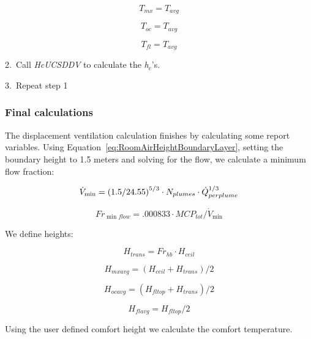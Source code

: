 {\begin{equation}
{T_{mx}} = {T_{avg}}
\end{equation}

\begin{equation}
{T_{oc}} = {T_{avg}}
\end{equation}

\begin{equation}
{T_{fl}} = {T_{avg}}
\end{equation}

2.~Call \emph{HcUCSDDV} to calculate the \emph{h\(_{c}\)}'s.

3.~Repeat step 1

\subsubsection{Final calculations}\label{final-calculations}

The displacement ventilation calculation finishes by calculating some report variables. Using Equation~\ref{eq:RoomAirHeightBoundaryLayer}, setting the boundary height to 1.5 meters and solving for the flow, we calculate a minimum flow fraction:

\begin{equation}
{\dot V_{\min }} = {(1.5/{\rm{24}}{\rm{.55)}}^{{\rm{5/3}}}} \cdot {N_{plumes}} \cdot \dot Q_{perplume}^{1/3}
\end{equation}

\begin{equation}
F{r_{\min flow}} = .000833 \cdot MC{P_{tot}}/{\dot V_{\min }}
\end{equation}

We define heights:

\begin{equation}
{H_{trans}} = F{r_{hb}} \cdot {H_{ceil}}
\end{equation}

\begin{equation}
{H_{mxavg}} = ({H_{ceil}} + {H_{trans}})/2
\end{equation}

\begin{equation}
{H_{ocavg}} = ({H_{fltop}} + {H_{trans}})/2
\end{equation}

\begin{equation}
{H_{flavg}} = {H_{fltop}}/2
\end{equation}

Using the user defined comfort height we calculate the comfort temperature.

}
